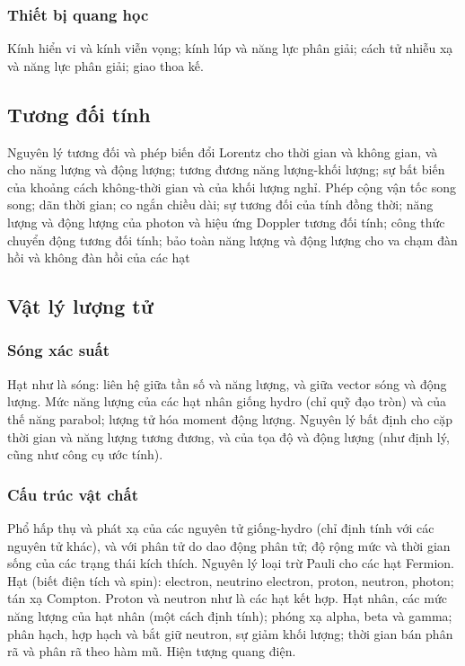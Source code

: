 \documentclass{article}
\begin{document}
\begin{multicols}{2}
\subsubsection{Thiết bị quang học}
Kính hiển vi và kính viễn vọng; kính lúp và năng lực phân giải; cách tử nhiễu xạ và năng lực phân giải; giao thoa kế.

\subsection{Tương đối tính}
Nguyên lý tương đối và phép biến đổi Lorentz cho thời gian và không gian, và cho năng lượng và động lượng; tương đương năng lượng-khối lượng; sự bất biến của khoảng cách không-thời gian và của khối lượng nghỉ. Phép cộng vận tốc song song; dãn thời gian; co ngắn chiều dài; sự tương đối của tính đồng thời; năng lượng và động lượng của photon và hiệu ứng Doppler tương đối tính; công thức chuyển động tương đối tính; bảo toàn năng lượng và động lượng cho va chạm đàn hồi và không đàn hồi của các hạt

\subsection{Vật lý lượng tử}
\subsubsection{Sóng xác suất}
Hạt như là sóng: liên hệ giữa tần số và năng lượng, và giữa vector sóng và động lượng. Mức năng lượng của các hạt nhân giống hydro (chỉ quỹ đạo tròn) và của thế năng parabol; lượng tử hóa moment động lượng. Nguyên lý bất định cho cặp thời gian và năng lượng tương đương, và của tọa độ và động lượng (như định lý, cũng như công cụ ước tính).

\subsubsection{Cấu trúc vật chất}
Phổ hấp thụ và phát xạ của các nguyên tử giống-hydro (chỉ định tính với các nguyên tử khác), và với phân tử do dao động phân tử; độ rộng mức và thời gian sống của các trạng thái kích thích. Nguyên lý loại trừ Pauli cho các hạt Fermion. Hạt (biết điện tích và spin): electron, neutrino electron, proton, neutron, photon; tán xạ Compton. Proton và neutron như là các hạt kết hợp. Hạt nhân, các mức năng lượng của hạt nhân (một cách định tính); phóng xạ alpha, beta và gamma; phân hạch, hợp hạch và bắt giữ neutron, sự giảm khối lượng; thời gian bán phân rã và phân rã theo hàm mũ. Hiện tượng quang điện.


\end{multicols}
\end{document}
